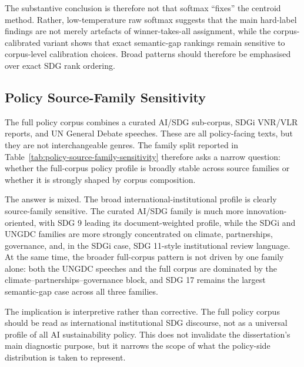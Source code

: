 \documentclass[12pt,a4paper]{article}
\begin{document}
\begin{table}[ht]
\centering
\small
\caption{Softmax-weighted multi-label robustness summary. Spearman correlations compare hard-label and softmax-based SDG rankings. Mean absolute differences (MAD) are absolute deviations from the hard-label baseline. The final column shows overlap in the top three semantic-gap SDGs relative to the hard-label ranking.}
\label{tab:softmax-multilabel-summary}

\end{table}

The substantive conclusion is therefore not that softmax ``fixes'' the centroid method. Rather, low-temperature raw softmax suggests that the main hard-label findings are not merely artefacts of winner-takes-all assignment, while the corpus-calibrated variant shows that exact semantic-gap rankings remain sensitive to corpus-level calibration choices. Broad patterns should therefore be emphasised over exact SDG rank ordering.

\subsection{Policy Source-Family Sensitivity}
\label{app:policy-source-family-sensitivity}

The full policy corpus combines a curated AI/SDG sub-corpus, SDGi VNR/VLR reports, and UN General Debate speeches. These are all policy-facing texts, but they are not interchangeable genres. The family split reported in Table~\ref{tab:policy-source-family-sensitivity} therefore asks a narrow question: whether the full-corpus policy profile is broadly stable across source families or whether it is strongly shaped by corpus composition.

The answer is mixed. The broad international-institutional profile is clearly source-family sensitive. The curated AI/SDG family is much more innovation-oriented, with SDG 9 leading its document-weighted profile, while the SDGi and UNGDC families are more strongly concentrated on climate, partnerships, governance, and, in the SDGi case, SDG 11-style institutional review language. At the same time, the broader full-corpus pattern is not driven by one family alone: both the UNGDC speeches and the full corpus are dominated by the climate--partnerships--governance block, and SDG 17 remains the largest semantic-gap case across all three families.

The implication is interpretive rather than corrective. The full policy corpus should be read as international institutional SDG discourse, not as a universal profile of all AI sustainability policy. This does not invalidate the dissertation's main diagnostic purpose, but it narrows the scope of what the policy-side distribution is taken to represent.
\end{document}
